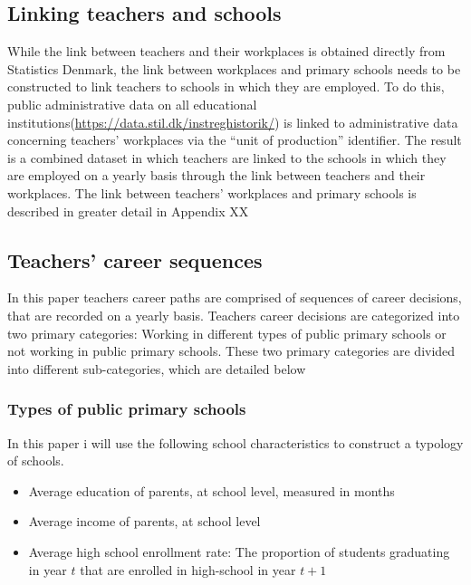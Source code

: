 \documentclass[
]{article}
\providecommand{\tightlist}{%
  \setlength{\itemsep}{0pt}\setlength{\parskip}{0pt}}
\begin{document}
\hypertarget{linking-teachers-and-schools}{%
\subsection{Linking teachers and schools}\label{linking-teachers-and-schools}}

While the link between teachers and their workplaces is obtained directly from Statistics Denmark, the link between workplaces and primary schools needs to be constructed to link teachers to schools in which they are employed. To do this, public administrative data on all educational institutions(\url{https://data.stil.dk/instreghistorik/}) is linked to administrative data concerning teachers' workplaces via the ``unit of production'' identifier. The result is a combined dataset in which teachers are linked to the schools in which they are employed on a yearly basis through the link between teachers and their workplaces. The link between teachers' workplaces and primary schools is described in greater detail in Appendix XX

\hypertarget{teachers-career-sequences}{%
\subsection{Teachers' career sequences}\label{teachers-career-sequences}}

In this paper teachers career paths are comprised of sequences of career decisions, that are recorded on a yearly basis. Teachers career decisions are categorized into two primary categories: Working in different types of public primary schools or not working in public primary schools. These two primary categories are divided into different sub-categories, which are detailed below

\hypertarget{types-of-public-primary-schools}{%
\subsubsection{Types of public primary schools}\label{types-of-public-primary-schools}}

In this paper i will use the following school characteristics to construct a typology of schools.

\begin{itemize}
\tightlist
\item
  Average education of parents, at school level, measured in months
\item
  Average income of parents, at school level
\item
  Average high school enrollment rate: The proportion of students graduating in year \(t\) that are enrolled in high-school in year \(t+1\)
\end{itemize}
\end{document}
